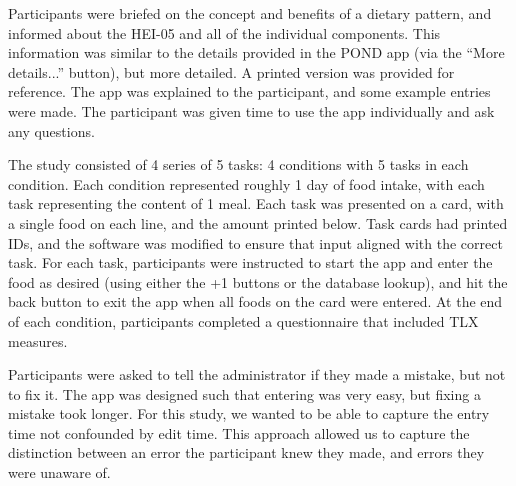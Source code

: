 Participants were briefed on the concept and benefits of a dietary pattern, and informed about the HEI-05 and all of the individual components. This information was similar to the details provided in the POND app (via the ``More details...'' button), but more detailed. A printed version was provided for reference. The app was explained to the participant, and some example entries were made. The participant was given time to use the app individually and ask any questions. 

The study consisted of 4 series of 5 tasks: 4 conditions with 5 tasks in each condition. Each condition represented roughly 1 day of food intake, with each task representing the content of 1 meal. Each task was presented on a card, with a single food on each line, and the amount printed below. Task cards had printed IDs, and the software was modified to ensure that input aligned with the correct task. For each task, participants were instructed to start the app and enter the food as desired (using either the +1 buttons or the database lookup), and hit the back button to exit the app when all foods on the card were entered.  At the end of each condition, participants completed a questionnaire that included TLX measures. 

Participants were asked to tell the administrator if they made a mistake, but not to fix it. The app was designed such that entering was very easy, but fixing a mistake took longer. For this study, we wanted to be able to capture the entry time not confounded by edit time. This approach allowed us to capture the distinction between an error the participant knew they made, and errors they were unaware of. 

